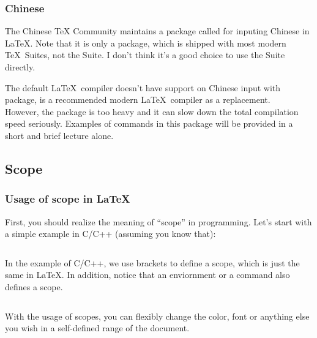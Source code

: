 \begin{frame}[fragile]
	\frametitle{Chinese}
	The Chinese TeX Community maintains a package called  for inputing Chinese in \LaTeX. Note that it is only a package, which is shipped with most modern \TeX\ Suites, not the  Suite. I don't think it's a good choice to use the  Suite directly.
	\begin{command}
		\texttt{\usepackage{ctex}}
	\end{command}
	The default \LaTeX\ compiler  doesn't have support on Chinese input with  package,  is a recommended modern \LaTeX\ compiler as a replacement. \\

	However, the  package is too heavy and it can slow down the total compilation speed seriously. Examples of commands in this package will be provided in a short and brief lecture alone.
\end{frame}

\subsection{Scope}

\begin{frame}[fragile]
	\frametitle{Usage of scope in \LaTeX}
	First, you should realize the meaning of ``scope'' in programming. Let's start with a simple example in C/C++ (assuming you know that):
	\inputminted{c++}{examples/scope.cpp}
\end{frame}

\begin{frame}[fragile]
	In the example of C/C++, we use brackets \structure{\{\}} to define a scope, which is just the same in \LaTeX. In addition, notice that an enviornment or a command also defines a scope.

	\begin{example}
	\begin{multicols}{2}
		\inputminted{latex}{examples/scope.tex}
		\columnbreak
		
	\end{multicols}
	\end{example}

	With the usage of scopes, you can flexibly change the color, font or anything else you wish in a self-defined range of the document.

\end{frame}
